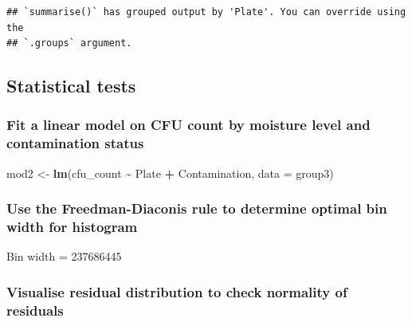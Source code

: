 \documentclass[
]{article}
\newenvironment{Shaded}{\begin{snugshade}}{\end{snugshade}}
\newcommand{\AttributeTok}[1]{\textcolor[rgb]{0.13,0.29,0.53}{#1}}
\newcommand{\DecValTok}[1]{\textcolor[rgb]{0.00,0.00,0.81}{#1}}
\newcommand{\FunctionTok}[1]{\textcolor[rgb]{0.13,0.29,0.53}{\textbf{#1}}}
\newcommand{\NormalTok}[1]{#1}
\newcommand{\OtherTok}[1]{\textcolor[rgb]{0.56,0.35,0.01}{#1}}
\newcommand{\SpecialCharTok}[1]{\textcolor[rgb]{0.81,0.36,0.00}{\textbf{#1}}}
\begin{document}
\begin{verbatim}
## `summarise()` has grouped output by 'Plate'. You can override using the
## `.groups` argument.
\end{verbatim}

\subsection{Statistical tests}\label{statistical-tests-1}

\subsubsection{Fit a linear model on CFU count by moisture level and
contamination
status}\label{fit-a-linear-model-on-cfu-count-by-moisture-level-and-contamination-status-1}

\begin{Shaded}
\begin{Highlighting}[]
\NormalTok{mod2 }\OtherTok{\textless{}{-}} \FunctionTok{lm}\NormalTok{(cfu\_count }\SpecialCharTok{\textasciitilde{}}\NormalTok{ Plate }\SpecialCharTok{+}\NormalTok{ Contamination, }\AttributeTok{data =}\NormalTok{ group3)}
\end{Highlighting}
\end{Shaded}

\subsubsection{Use the Freedman-Diaconis rule to determine optimal bin
width for
histogram}\label{use-the-freedman-diaconis-rule-to-determine-optimal-bin-width-for-histogram}

\begin{Shaded}
\end{Shaded}

Bin width = 237686445

\subsubsection{Visualise residual distribution to check normality of
residuals}\label{visualise-residual-distribution-to-check-normality-of-residuals-1}
\end{document}
